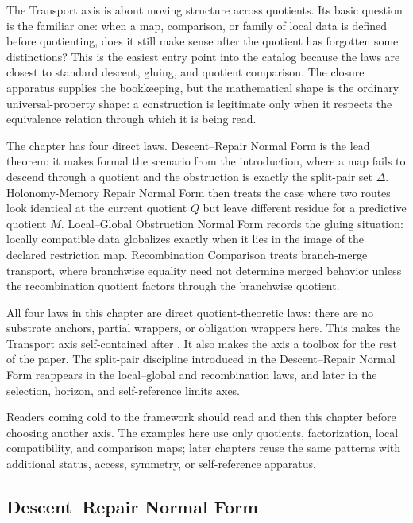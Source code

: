 \documentclass[11pt]{article}
\newcommand{\currQ}{Q}                 \newcommand{\predM}{M}                 \newcommand{\splitObs}{\Delta}         \newcommand{\quotMap}{\pi}             \newcommand{\accessQ}{q_I}             \newcommand{\obsSig}{\sigma_I}         \newcommand{\closureForm}{\mathsf{cl}} \newcommand{\BirdInt}{\mathsf{BirdInt}}
\theoremstyle{definition}
\begin{document}
The Transport axis is about moving structure across quotients.  Its
basic question is the familiar one: when a map, comparison, or family
of local data is defined before quotienting, does it still make sense
after the quotient has forgotten some distinctions?  This is the
easiest entry point into the catalog because the laws are closest to
standard descent, gluing, and quotient comparison.  The closure
apparatus supplies the bookkeeping, but the mathematical shape is the
ordinary universal-property shape: a construction is legitimate only
when it respects the equivalence relation through which it is being
read.

The chapter has four direct laws.  Descent--Repair Normal Form is
the lead theorem: it makes formal the scenario from the
introduction, where a
map fails to descend through a quotient and the obstruction is exactly
the split-pair set \(\splitObs\).  Holonomy-Memory Repair Normal Form
then treats the case where two routes look identical at the current
quotient \(\currQ\) but leave different residue for a predictive
quotient \(\predM\).  Local--Global Obstruction Normal Form records
the gluing situation: locally compatible data globalizes exactly when
it lies in the image of the declared restriction map.  Recombination
Comparison treats branch-merge transport, where branchwise equality
need not determine merged behavior unless the recombination quotient
factors through the branchwise quotient.

All four laws in this chapter are direct quotient-theoretic laws:
there are no substrate anchors, partial wrappers, or obligation
wrappers here.  This makes the Transport axis self-contained after
.  It also makes the axis a toolbox for the rest
of the paper.  The split-pair discipline introduced in the
Descent--Repair Normal Form reappears in the local--global and
recombination laws, and later in the selection, horizon, and
self-reference limits axes.

Readers coming cold to the framework should read
 and then this chapter before choosing another
axis.  The examples here use only quotients, factorization, local
compatibility, and comparison maps; later chapters reuse the same
patterns with additional status, access, symmetry, or self-reference
apparatus.

\subsection{Descent--Repair Normal Form}\label{sec:transport:descent-repair}
\end{document}
